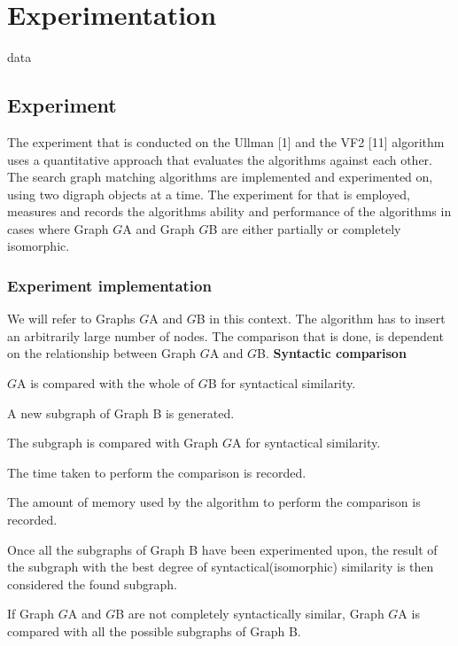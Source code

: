 \section{Experimentation}
\label{Experimentation}

{data}

\subsection{Experiment}
The experiment that is conducted on the Ullman [1] and the VF2 [11] algorithm uses a quantitative approach that evaluates the algorithms against each 
other. The search graph matching algorithms are implemented and experimented on, using two digraph objects at a time. The experiment for that is 
employed, measures and records the algorithms ability and performance of the algorithms in cases where Graph $G${\tiny A} and Graph $G${\tiny B} are 
either partially or completely isomorphic.
\subsubsection{Experiment implementation}

We will refer to Graphs $G${\tiny A} and $G${\tiny B} in this context.\newline\newline
The algorithm has to insert an arbitrarily large number of nodes.\newline\newline
The comparison that is done, is dependent on the relationship between Graph $G${\tiny A} and $G${\tiny B}.\newline\newline
\textbf{Syntactic comparison}					
\begin{myEnumerate}
\item $G${\tiny A} is compared with the whole of $G${\tiny B} for syntactical similarity.										
\begin{myEnumerate}
\item A new subgraph of Graph B is generated.
\item The subgraph is compared with Graph $G${\tiny A} for syntactical similarity.											
\begin{myEnumerate}
\item The time taken to perform the comparison is recorded.
\item The amount of memory used by the algorithm to perform the comparison is recorded.
\end{myEnumerate}	
\item Once all the subgraphs of Graph B have been experimented upon, the result of the subgraph with the best degree of syntactical(isomorphic) 
similarity is then considered the found subgraph.
\end{myEnumerate}
\item If Graph $G${\tiny A} and $G${\tiny B} are not completely syntactically similar, Graph $G${\tiny A} is compared with all the possible subgraphs of Graph B.
\end{myEnumerate}

